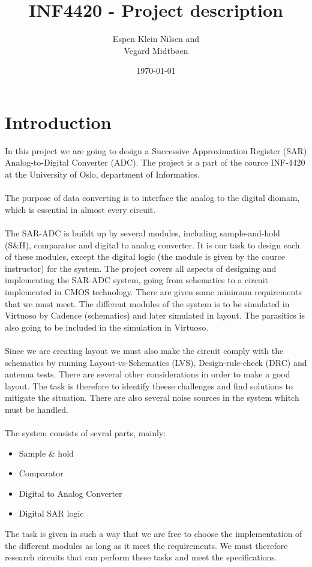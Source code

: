 \documentclass[english, 12pt, a4paper]{article}
\title{INF4420 - Project description}
\author{Espen Klein Nilsen and\\
	Vegard Midtbøen}
\date{\today}
\begin{document}
 \maketitle
 
\section*{Introduction}
In this project we are going to design a Successive Approximation Register (SAR) Analog-to-Digital Converter (ADC). The project is a part 
of the cource INF-4420 at the University of Oslo, department of Informatics.\\
\\
The purpose of data converting is to interface the analog to the digital diomain, which is essential in almost every circuit.\\
\\
The SAR-ADC is buildt up by several modules, including sample-and-hold (S\&H), comparator and digital to analog converter. It is our task to design each of these modules, except the digital logic 
(the module is given by the cource instructor) for the system. The project covers all aspects of designing and implementing the SAR-ADC system, going from schematics to a circuit implemented in 
CMOS technology. There are given some minimum requirements that we must meet. The different modules of the system is to be simulated in Virtuoso by Cadence (schematics) and later simulated in layout. 
The parasitics is also going to be included in the simulation in Virtuoso.\\
\\
Since we are creating layout we must also make the circuit comply with the schematics by running Layout-vs-Schematics (LVS), Design-rule-check (DRC) and antenna tests. 
There are several other considerations in order to make a good layout. The task is therefore to identify theese challenges and find solutions to mitigate the situation. 
There are also several noise sources in the system whitch must be handled.\\
\\
The system consists of sevral parts, mainly:
\begin{itemize}
 \item Sample \& hold
 \item Comparator
 \item Digital to Analog Converter
 \item Digital SAR logic
\end{itemize}
The task is given in such a way that we are free to choose the implementation of the different modules as long as it meet the requirements. 
We must therefore research circuits that can perform these tasks and meet the specifications. 
\end{document}
